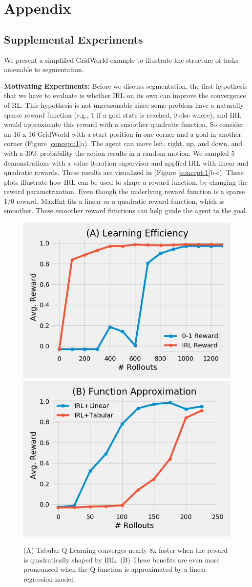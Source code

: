 \section{Appendix}

\subsection{Supplemental Experiments}
We present a simplified GridWorld example to illustrate the structure of tasks amenable to segmentation. 

\vspace{0.5em} \noindent \textbf{Motivating Experiments: } Before we discuss segmentation, the first hypothesis that we have to evaluate is whether IRL on its own can improve the convergence of RL. This hypothesis is not unreasonable since some problem have a naturally sparse reward function (e.g., 1 if a goal state is reached, 0 else where), and IRL would approximate this reward with a smoother quadratic function. So consider an 16 x 16 GridWorld with a start position in one corner and a goal in another corner (Figure \ref{concept:1}a). 
The agent can move left, right, up, and down, and with a 30\% probability the action results in a random motion.
We sampled 5 demonstrations with a value iteration supervisor and applied IRL with linear and quadratic rewards. These results are visualized in (Figure \ref{concept:1}b-c).
These plots illustrate how IRL can be used to shape a reward function, by changing the reward parametrization. Even though the underlying reward function is a sparse 1/0 reward,  MaxEnt fits a linear or a quadratic reward function, which is smoother. These smoother reward functions can help guide the agent to the goal.

\begin{figure}[ht]
\centering
 \includegraphics[width=0.48\columnwidth]{concept/1.png}
  \includegraphics[width=0.48\columnwidth]{concept/2.png}
 \caption{(A) Tabular Q-Learning converges nearly 8x faster when the reward is quadratically shaped by IRL. (B) These benefits are even more pronounced when the Q function is approximated by a linear regression model. \label{concept:2}}
\end{figure}

